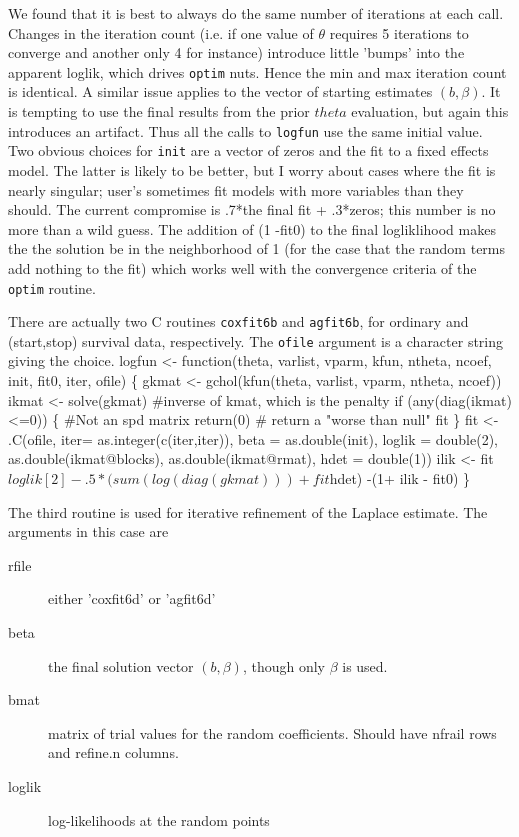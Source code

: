 \documentclass{article}
\begin{document}
We found that it is best to always do the same number of iterations at
each call.  Changes in the iteration count (i.e. if one value of
$\theta$ requires 5 iterations to converge and another only 4 for instance) 
introduce little 'bumps' into the apparent loglik, which
drives {\tt{}optim} nuts. Hence the min and max iteration count is identical.
A similar issue applies to the vector of starting estimates $(b, \beta)$.
It is tempting to use the final results from the prior $theta$ evaluation,
but again this introduces an artifact.
Thus all the calls to {\tt{}logfun} use the same initial value.
Two obvious choices for {\tt{}init} are a vector of zeros and the fit
to a fixed effects model.  The latter is likely to be better,
but I worry about cases where the fit is nearly
singular; user's sometimes fit models with more variables than they should. %
The current compromise is .7*the final fit + .3*zeros; this number is no
more than a wild guess.
The addition of (1 -fit0) to the final logliklihood makes the 
the solution be in the neighborhood of 1 (for the case that the random
terms add nothing to the fit)
which works well with the convergence criteria of
the {\tt{}optim} routine.

There are actually two C routines {\tt{}coxfit6b} and {\tt{}agfit6b}, for ordinary
and (start,stop) survival data, respectively.  The {\tt{}ofile} argument 
is a character string giving the choice.
\nwenddocs{}\endmoddef
logfun <- function(theta, varlist, vparm, kfun, ntheta, ncoef, 
                   init, fit0, iter, ofile) \{
    gkmat <- gchol(kfun(theta, varlist, vparm, ntheta, ncoef))
    ikmat <- solve(gkmat)  #inverse of kmat, which is the penalty
    if (any(diag(ikmat) <=0)) \{ #Not an spd matrix
        return(0)  # return a "worse than null" fit
        \}
    fit <- .C(ofile,
              iter= as.integer(c(iter,iter)),
              beta = as.double(init),
              loglik = double(2),
              as.double(ikmat@blocks),
              as.double(ikmat@rmat),
              hdet = double(1))
    ilik <- fit$loglik[2] -
             .5*(sum(log(diag(gkmat))) + fit$hdet)
    -(1+ ilik - fit0)
    \}
\nwendcode{}\nwdocspar


The third routine is used for iterative refinement of the Laplace
estimate. The arguments in this case are
\begin{description}
  \item[rfile] either 'coxfit6d' or 'agfit6d'
  \item[beta] the final solution vector $(b, \beta)$, though only $\beta$
    is used.
  \item[bmat] matrix of trial values for the random coefficients.
    Should have nfrail rows and refine.n columns.
  \item[loglik] log-likelihoods at the random points
\end{description}
\end{document}

